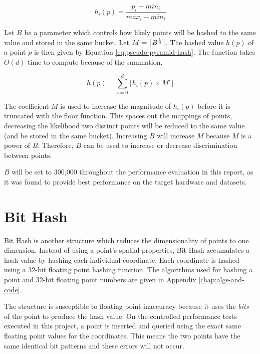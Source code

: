 \begin{equation}
	h_i(p) = \frac{p_i - min_i}{max_i - min_i}
	\label{eq:point-boundary-distance}
\end{equation}

Let $B$ be a parameter which controls how likely points will be hashed to the same value and stored in the same bucket. Let $M = \lceil B^{\frac{1}{d}}\rceil$. The hashed value $h(p)$ of a point $p$ is then given by Equation \ref{eq:pseudo-pyramid-hash}. The function takes $O(d)$ time to compute because of the summation.

\begin{equation}
	h(p) = \sum_{i = 0}^{d} { \lfloor h_i(p) \times M^{i} \rfloor }
	\label{eq:pseudo-pyramid-hash}
\end{equation}

The coefficient $M$ is used to increase the magnitude of $h_i(p)$ before it is truncated with the floor function. This spaces out the mappings of points, decreasing the likelihood two distinct points will be reduced to the same value (and be stored in the same bucket). Increasing $B$ will increase $M$ because $M$ is a power of $B$. Therefore, $B$ can be used to increase or decrease discrimination between points.

$B$ will be set to 300,000 throughout the performance evaluation in this report, as it was found to provide best performance on the target hardware and datasets.

\section{Bit Hash}
\label{sec:bit-hash}


Bit Hash is another structure which reduces the dimensionality of points to one dimension. Instead of using a point's spatial properties, Bit Hash accumulates a hash value by hashing each individual coordinate. Each coordinate is hashed using a  32-bit floating point hashing function. The algorithms used for hashing a point and 32-bit floating point numbers are given in Appendix \ref{chap:algs-and-code}.

The structure is susceptible to floating point inaccuracy because it uses the \textit{bits} of the point to produce the hash value. On the controlled performance tests executed in this project, a point is inserted and queried using the exact same floating point values for the coordinates. This means the two points have the same identical bit patterns and these errors will not occur.

